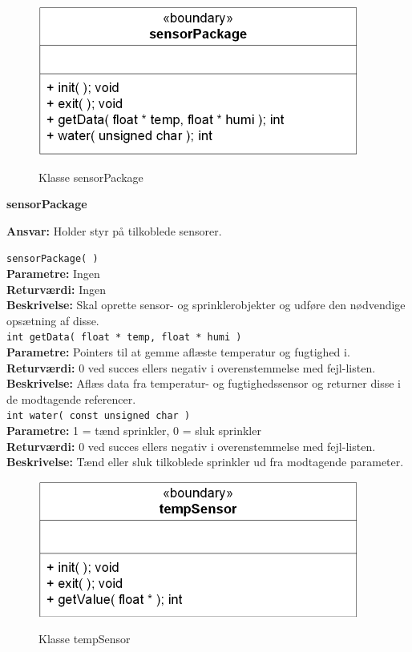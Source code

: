 
\begin{figure}[htbp] \centering
{\includegraphics[scale=1.3]{filer/design/Klassediagrammer/sw_psoc_sensorPackage}}
\caption{Klasse sensorPackage}
\label{fig:sw_psoc_class_sensorPackage}
\end{figure} 

{\centering
\textbf{sensorPackage}\par
}
\textbf{Ansvar:} Holder styr på tilkoblede sensorer. \

\verb+sensorPackage( ) +\\
\textbf{Parametre:} Ingen \\
\textbf{Returværdi:} Ingen \\
\textbf{Beskrivelse:} Skal oprette sensor- og sprinklerobjekter og udføre den nødvendige opsætning af disse. \\

\verb+int getData( float * temp, float * humi )+ \\
\textbf{Parametre:} Pointers til at gemme aflæste temperatur og fugtighed i. \\
\textbf{Returværdi:} 0 ved succes ellers negativ i overenstemmelse med fejl-listen. \\
\textbf{Beskrivelse:} Aflæs data fra temperatur- og fugtighedssensor og returner disse i de modtagende referencer. \\

\verb+int water( const unsigned char )+ \\
\textbf{Parametre:} 1 = tænd sprinkler, 0 = sluk sprinkler \\
\textbf{Returværdi:} 0 ved succes ellers negativ i overenstemmelse med fejl-listen. \\
\textbf{Beskrivelse:} Tænd eller sluk tilkoblede sprinkler ud fra modtagende parameter. \\


\begin{figure}[htbp] \centering
{\includegraphics[scale=1.3]{filer/design/Klassediagrammer/sw_psoc_tempSensor}}
\caption{Klasse tempSensor}
\label{fig:sw_psoc_class_tempSensor}
\end{figure} 

